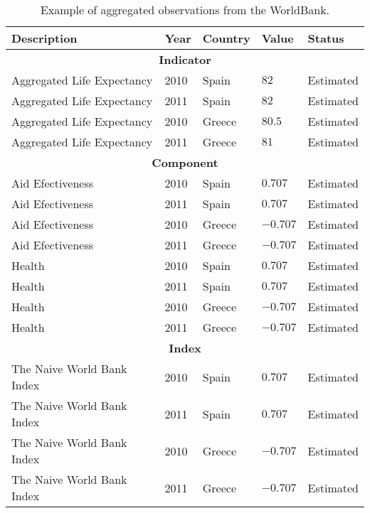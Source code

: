 \begin{table}[!htb]
\renewcommand{\arraystretch}{1.3}
\begin{center}
\begin{tabular}{|p{4.5cm}|p{1cm}|p{1.5cm}|p{1cm}|p{1.8cm}|}
\hline
  \textbf{Description} & \textbf{Year} & \textbf{Country} & \textbf{Value} & \textbf{Status} \\  \hline
  \multicolumn{5}{|c|}{\textbf{Indicator}} \\ \hline
  Aggregated Life Expectancy  & 2010 & Spain & $82$ & Estimated \\ \hline
  Aggregated Life Expectancy  & 2011 & Spain & $82$ & Estimated \\ \hline
  Aggregated Life Expectancy  & 2010 & Greece & $80.5$ & Estimated \\ \hline
  Aggregated Life Expectancy  & 2011 & Greece & $81$ & Estimated \\ \hline
  \multicolumn{5}{|c|}{\textbf{Component}} \\ \hline
  Aid Efectiveness  & 2010 & Spain & $0.707$  & Estimated \\ \hline
  Aid Efectiveness  & 2011 & Spain & $0.707$  & Estimated \\ \hline
  Aid Efectiveness  & 2010 & Greece & $-0.707$ & Estimated \\ \hline
  Aid Efectiveness  & 2011 & Greece & $-0.707$ & Estimated \\ \hline
  Health & 2010 & Spain & $0.707$ & Estimated \\ \hline
  Health & 2011 & Spain & $0.707$ & Estimated \\ \hline
  Health & 2010 & Greece & $-0.707$ & Estimated \\ \hline
  Health & 2011 & Greece & $-0.707$ & Estimated \\ \hline
 \multicolumn{5}{|c|}{\textbf{Index}} \\ \hline
  The Naive World Bank Index & 2010 & Spain & $0.707$ & Estimated \\ \hline
  The Naive World Bank Index & 2011 & Spain & $0.707$ & Estimated \\ \hline
  The Naive World Bank Index & 2010 & Greece & $-0.707$ & Estimated \\ \hline
  The Naive World Bank Index & 2011 & Greece & $-0.707$ & Estimated\\ \hline
  \hline
  \end{tabular}
  \caption{Example of aggregated observations from the WorldBank.}
  \label{tab:example-generated-wb}
  \end{center}	 
\end{table} 



